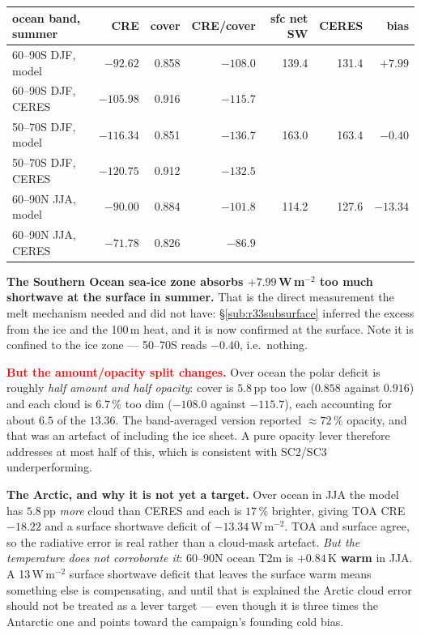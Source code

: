\documentclass[10pt]{article}
\begin{document}
\begin{center}\small
\begin{tabular}{lrrrrrr}
\toprule
ocean band, summer & CRE & cover & CRE/cover & sfc net SW & CERES & bias \\
\midrule
60--90S DJF, model & $-92.62$ & 0.858 & $-108.0$ & 139.4 & 131.4 & $\mathbf{+7.99}$ \\
60--90S DJF, CERES & $-105.98$ & 0.916 & $-115.7$ & & & \\
\midrule
50--70S DJF, model & $-116.34$ & 0.851 & $-136.7$ & 163.0 & 163.4 & $-0.40$ \\
50--70S DJF, CERES & $-120.75$ & 0.912 & $-132.5$ & & & \\
\midrule
60--90N JJA, model & $-90.00$ & 0.884 & $-101.8$ & 114.2 & 127.6 & $\mathbf{-13.34}$ \\
60--90N JJA, CERES & $-71.78$ & 0.826 & $-86.9$ & & & \\
\bottomrule
\end{tabular}
\end{center}

\textbf{The Southern Ocean sea-ice zone absorbs $+7.99$\,W\,m$^{-2}$ too much shortwave at
the surface in summer.} That is the direct measurement the melt mechanism needed and did
not have: \S\ref{sub:r33subsurface} inferred the excess from the ice and the 100\,m heat,
and it is now confirmed at the surface. Note it is confined to the ice zone --- 50--70S
reads $-0.40$, i.e.\ nothing.

\textcolor{red}{\textbf{But the amount/opacity split changes.}} Over ocean the polar
deficit is roughly \emph{half amount and half opacity}: cover is $5.8$\,pp too low
($0.858$ against $0.916$) and each cloud is $6.7\,\%$ too dim ($-108.0$ against $-115.7$),
each accounting for about $6.5$ of the $13.36$. The band-averaged version reported
$\approx72\,\%$ opacity, and that was an artefact of including the ice sheet. A pure
opacity lever therefore addresses at most half of this, which is consistent with SC2/SC3
underperforming.

\textbf{The Arctic, and why it is not yet a target.} Over ocean in JJA the model has
$5.8$\,pp \emph{more} cloud than CERES and each is $17\,\%$ brighter, giving TOA CRE
$-18.22$ and a surface shortwave deficit of $-13.34$\,W\,m$^{-2}$. TOA and surface agree,
so the radiative error is real rather than a cloud-mask artefact. \emph{But the
temperature does not corroborate it}: 60--90N ocean T2m is $+0.84$\,K \textbf{warm} in
JJA. A 13\,W\,m$^{-2}$ surface shortwave deficit that leaves the surface warm means
something else is compensating, and until that is explained the Arctic cloud error should
not be treated as a lever target --- even though it is three times the Antarctic one and
points toward the campaign's founding cold bias.
\end{document}

